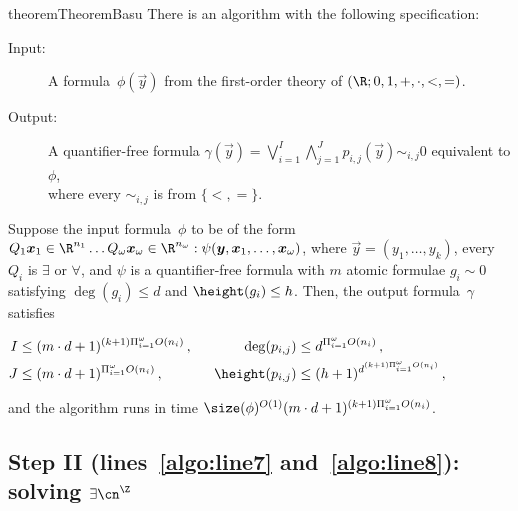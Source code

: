 \begin{restatable}{theorem}{TheoremBasu}
  \label{theorem:basu}
  There is an algorithm with the following specification:
  \begin{center}
    \begin{minipage}{0.95\linewidth}
      \begin{description}
        \item[\textup{Input:}]\tab A formula~$\phi(\vec y)$ from the first-order
          theory of $(\R; 0, 1, +, \cdot, <, =)$.
        \item[\textup{Output:}]\tab A quantifier-free formula $\gamma(\vec y) =
          \bigvee_{i = 1}^I \bigwedge_{j = 1}^J p_{i,j}(\vec y) \sim_{i,j} 0$
          equivalent to $\phi$,\\ 
          \tab\tab where every $\sim_{i,j}$ is from $\{<,=\}$.
      \end{description}
    \end{minipage}
  \end{center}
  Suppose the input formula~$\phi$ to be of the form $Q_1 \vec x_1 \in \R^{n_1}
  \dots Q_\omega \vec x_\omega \in \R^{n_\omega} : \psi(\vec y, \vec x_1, \dots,
  \vec x_\omega)$, where $\vec y = (y_1,\dots,y_k)$, every $Q_i$ is $\exists$ or
  $\forall$, and $\psi$ is a quantifier-free formula with $m$ atomic formulae
  $g_i \sim 0$ satisfying $\deg(g_i) \leq d$ and $\height(g_i) \leq h$. Then,
  the output formula~$\gamma$ satisfies
  \begin{center}
      $\begin{aligned} I &\leq (m \cdot d + 1 )^{(k+1) \Pi_{i=1}^\omega
        O(n_i)}\,, &\hspace{1cm} \deg(p_{i,j}) &\leq d^{\Pi_{i=1}^\omega
        O(n_i)}\,, \\
        J &\leq (m \cdot d + 1)^{\Pi_{i=1}^\omega O(n_i)}\,, & \height(p_{i,j})
        &\leq (h+1)^{d^{(k+1) \Pi_{i=1}^\omega O(n_i)}}\,, \end{aligned}$
        \vspace{-3pt}
  \end{center}
  and the algorithm runs in time $\size(\phi)^{O(1)}(m \cdot d
  +1)^{(k+1)\Pi_{i=1}^\omega O(n_i)}$.
\end{restatable}


\subsection{Step II (lines~\ref{algo:line7} and~\ref{algo:line8}):
solving \texorpdfstring{$\exists\ipow{\cn}$}{the existential theory over integer powers of the base}}\label{subsection:algorithm-step-two}

